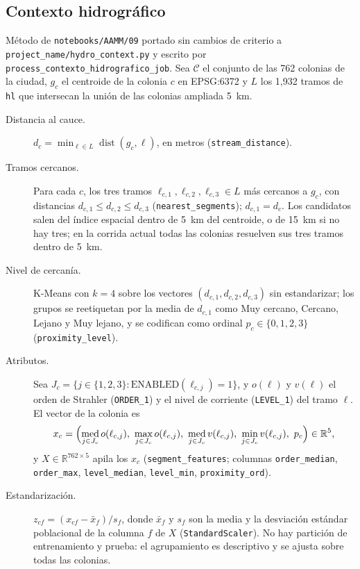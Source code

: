 \documentclass[11pt]{article}
\newcommand{\cod}[1]{\nolinkurl{#1}}
\begin{document}
\subsection{Contexto hidrográfico}
\label{sec:defs-contexto}

Método de \cod{notebooks/AAMM/09} portado sin cambios de criterio a \cod{project_name/hydro_context.py} y escrito por \cod{process_contexto_hidrografico_job}. Sea $\mathcal{C}$ el conjunto de las 762 colonias de la ciudad, $g_c$ el centroide de la colonia $c$ en EPSG:6372 y $L$ los 1,932 tramos de \cod{hl} que intersecan la unión de las colonias ampliada 5~km.

\begin{description}
  \item[Distancia al cauce.] $d_c=\min_{\ell\in L}\operatorname{dist}(g_c,\ell)$, en metros (\cod{stream_distance}).
  \item[Tramos cercanos.] Para cada $c$, los tres tramos $\ell_{c,1},\ell_{c,2},\ell_{c,3}\in L$ más cercanos a $g_c$, con distancias $d_{c,1}\le d_{c,2}\le d_{c,3}$ (\cod{nearest_segments}); $d_{c,1}=d_c$. Los candidatos salen del índice espacial dentro de 5~km del centroide, o de 15~km si no hay tres; en la corrida actual todas las colonias resuelven sus tres tramos dentro de 5~km.
  \item[Nivel de cercanía.] K-Means con $k=4$ sobre los vectores $(d_{c,1},d_{c,2},d_{c,3})$ sin estandarizar; los grupos se reetiquetan por la media de $d_{c,1}$ como Muy cercano, Cercano, Lejano y Muy lejano, y se codifican como ordinal $p_c\in\{0,1,2,3\}$ (\cod{proximity_level}).
  \item[Atributos.] Sea $J_c=\{j\in\{1,2,3\}:\text{ENABLED}(\ell_{c,j})=1\}$, y $o(\ell)$ y $v(\ell)$ el orden de Strahler (\cod{ORDER_1}) y el nivel de corriente (\cod{LEVEL_1}) del tramo $\ell$. El vector de la colonia es
  \[ x_c=\Bigl(\operatorname*{med}_{j\in J_c}o(\ell_{c,j}),\ \max_{j\in J_c}o(\ell_{c,j}),\ \operatorname*{med}_{j\in J_c}v(\ell_{c,j}),\ \min_{j\in J_c}v(\ell_{c,j}),\ p_c\Bigr)\in\mathbb{R}^5, \]
  y $X\in\mathbb{R}^{762\times 5}$ apila los $x_c$ (\cod{segment_features}; columnas \cod{order_median}, \cod{order_max}, \cod{level_median}, \cod{level_min}, \cod{proximity_ord}).
  \item[Estandarización.] $z_{cf}=(x_{cf}-\bar{x}_f)/s_f$, donde $\bar{x}_f$ y $s_f$ son la media y la desviación estándar poblacional de la columna $f$ de $X$ (\cod{StandardScaler}). No hay partición de entrenamiento y prueba: el agrupamiento es descriptivo y se ajusta sobre todas las colonias.

\end{description}
\end{document}
